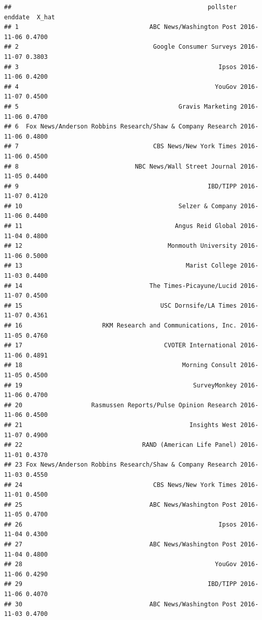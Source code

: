 \documentclass[
]{article}
\begin{document}
\begin{verbatim}
##                                                      pollster    enddate  X_hat
## 1                                    ABC News/Washington Post 2016-11-06 0.4700
## 2                                     Google Consumer Surveys 2016-11-07 0.3803
## 3                                                       Ipsos 2016-11-06 0.4200
## 4                                                      YouGov 2016-11-07 0.4500
## 5                                            Gravis Marketing 2016-11-06 0.4700
## 6  Fox News/Anderson Robbins Research/Shaw & Company Research 2016-11-06 0.4800
## 7                                     CBS News/New York Times 2016-11-06 0.4500
## 8                                NBC News/Wall Street Journal 2016-11-05 0.4400
## 9                                                    IBD/TIPP 2016-11-07 0.4120
## 10                                           Selzer & Company 2016-11-06 0.4400
## 11                                          Angus Reid Global 2016-11-04 0.4800
## 12                                        Monmouth University 2016-11-06 0.5000
## 13                                             Marist College 2016-11-03 0.4400
## 14                                   The Times-Picayune/Lucid 2016-11-07 0.4500
## 15                                      USC Dornsife/LA Times 2016-11-07 0.4361
## 16                      RKM Research and Communications, Inc. 2016-11-05 0.4760
## 17                                       CVOTER International 2016-11-06 0.4891
## 18                                            Morning Consult 2016-11-05 0.4500
## 19                                               SurveyMonkey 2016-11-06 0.4700
## 20                   Rasmussen Reports/Pulse Opinion Research 2016-11-06 0.4500
## 21                                              Insights West 2016-11-07 0.4900
## 22                                 RAND (American Life Panel) 2016-11-01 0.4370
## 23 Fox News/Anderson Robbins Research/Shaw & Company Research 2016-11-03 0.4550
## 24                                    CBS News/New York Times 2016-11-01 0.4500
## 25                                   ABC News/Washington Post 2016-11-05 0.4700
## 26                                                      Ipsos 2016-11-04 0.4300
## 27                                   ABC News/Washington Post 2016-11-04 0.4800
## 28                                                     YouGov 2016-11-06 0.4290
## 29                                                   IBD/TIPP 2016-11-06 0.4070
## 30                                   ABC News/Washington Post 2016-11-03 0.4700

\end{verbatim}
\end{document}

